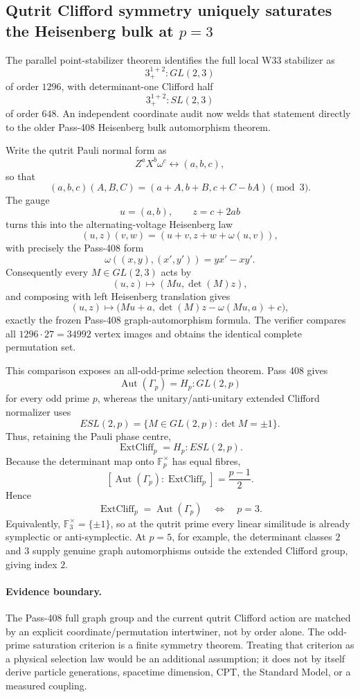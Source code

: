 \subsection*{Qutrit Clifford symmetry uniquely saturates the Heisenberg bulk at \(p=3\)}

The parallel point-stabilizer theorem identifies the full local W33 stabilizer as
\[
3_+^{1+2}:GL(2,3)
\]
of order \(1296\), with determinant-one Clifford half
\[
3_+^{1+2}:SL(2,3)
\]
of order \(648\).  An independent coordinate audit now welds that statement
directly to the older Pass-408 Heisenberg bulk automorphism theorem.

Write the qutrit Pauli normal form as
\[
Z^aX^b\omega^c\leftrightarrow(a,b,c),
\]
so that
\[
(a,b,c)(A,B,C)=(a+A,b+B,c+C-bA)
\pmod 3.
\]
The gauge
\[
\boxed{\quad u=(a,b),\qquad z=c+2ab\quad}
\]
turns this into the alternating-voltage Heisenberg law
\[
(u,z)(v,w)=(u+v,z+w+\omega(u,v)),
\]
with precisely the Pass-408 form
\[
\omega((x,y),(x',y'))=yx'-xy'.
\]
Consequently every \(M\in GL(2,3)\) acts by
\[
(u,z)\longmapsto(Mu,\det(M)z),
\]
and composing with left Heisenberg translation gives
\[
\boxed{
(u,z)\longmapsto
\bigl(Mu+a,\det(M)z-\omega(Mu,a)+c\bigr),
}
\]
exactly the frozen Pass-408 graph-automorphism formula.  The verifier compares
all \(1296\cdot27=34992\) vertex images and obtains the identical complete
permutation set.

This comparison exposes an all-odd-prime selection theorem.  Pass 408 gives
\[
\operatorname{Aut}(\Gamma_p)=H_p:GL(2,p)
\]
for every odd prime \(p\), whereas the unitary/anti-unitary extended Clifford
normalizer uses
\[
ESL(2,p)=\{M\in GL(2,p):\det M=\pm1\}.
\]
Thus, retaining the Pauli phase centre,
\[
\operatorname{ExtCliff}_p=H_p:ESL(2,p).
\]
Because the determinant map onto \(\mathbb F_p^\times\) has equal fibres,
\[
\boxed{
[\operatorname{Aut}(\Gamma_p):\operatorname{ExtCliff}_p]
=
\frac{p-1}{2}.
}
\]
Hence
\[
\boxed{
\operatorname{ExtCliff}_p=\operatorname{Aut}(\Gamma_p)
\quad\Longleftrightarrow\quad p=3.
}
\]
Equivalently, \(\mathbb F_3^\times=\{\pm1\}\), so at the qutrit prime every
linear similitude is already symplectic or anti-symplectic.  At \(p=5\), for
example, the determinant classes \(2\) and \(3\) supply genuine graph
automorphisms outside the extended Clifford group, giving index \(2\).

\paragraph{Evidence boundary.}
The Pass-408 full graph group and the current qutrit Clifford action are matched
by an explicit coordinate/permutation intertwiner, not by order alone.  The
odd-prime saturation criterion is a finite symmetry theorem.  Treating that
criterion as a physical selection law would be an additional assumption; it
does not by itself derive particle generations, spacetime dimension, CPT, the
Standard Model, or a measured coupling.
